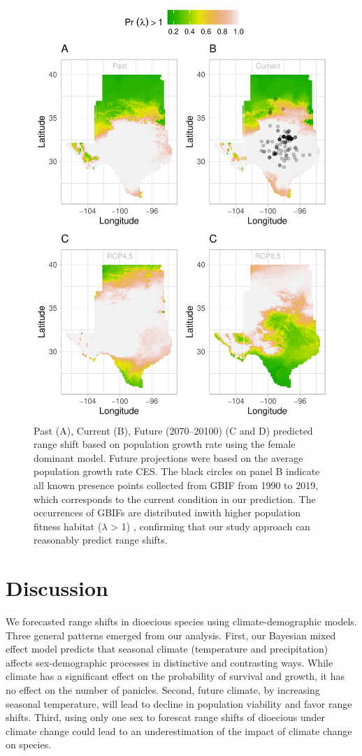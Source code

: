 \documentclass[12pt]{article}
\begin{document}
\begin{figure}[H]
  \begin{center}
    \includegraphics[width=0.75\linewidth]{Figures/Fig_geoPrlambdaprojection_fd_cmc.pdf}
  \caption{Past (A), Current (B), Future (2070–20100) (C and D) predicted range shift based on population growth rate using the female dominant model. Future projections were based on the average population growth rate CES. The black circles on panel B indicate all known presence points collected from GBIF from 1990 to 2019, which corresponds to the current condition in our prediction.  The occurrences of GBIFs are distributed inwith higher population fitness habitat ($\lambda$ > 1) , confirming that our study approach can reasonably predict range shifts. }
  \label{fig:geoprojfdcmc}
  \end{center}
\end{figure}

\section*{Discussion}
We forecasted range shifts in dioecious species using climate-demographic models. 
Three general patterns emerged from our analysis. First, our Bayesian mixed effect model predicts that seasonal climate (temperature and precipitation) affects sex-demographic processes in distinctive and contrasting ways.
While climate has a significant effect on the probability of survival and growth, it has no effect on the number of panicles. Second, future climate, by increasing seasonal temperature, will lead to decline in population viability and favor range shifts. 
Third, using only one sex to forescat range shifts of dioecious under climate change could lead to an underestimation of the impact of  climate change on species.
\end{document}

